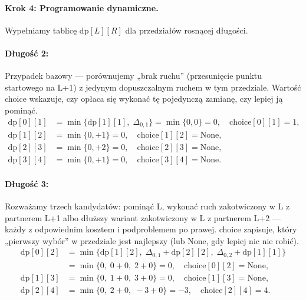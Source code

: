 \paragraph{Krok 4: Programowanie dynamiczne.}

Wypełniamy tablicę $\mathrm{dp}[L][R]$ dla przedziałów rosnącej długości.

\paragraph{Długość 2:} Przypadek bazowy — porównujemy „brak ruchu” (przesunięcie punktu startowego na L+1) z jedynym dopuszczalnym ruchem w tym przedziale. Wartość choice wskazuje, czy opłaca się wykonać tę pojedynczą zamianę, czy lepiej ją pominąć.
\begin{equation}\label{dp_len_2}
\begin{aligned}
\mathrm{dp}[0][1] &= \min\{\mathrm{dp}[1][1], \; \Delta_{0,1}\} = \min\{0, 0\} = 0, \quad \mathrm{choice}[0][1] = 1, \\
\mathrm{dp}[1][2] &= \min\{0, +1\} = 0, \quad \mathrm{choice}[1][2] = \text{None}, \\
\mathrm{dp}[2][3] &= \min\{0, +2\} = 0, \quad \mathrm{choice}[2][3] = \text{None}, \\
\mathrm{dp}[3][4] &= \min\{0, +1\} = 0, \quad \mathrm{choice}[3][4] = \text{None}.
\end{aligned}
\end{equation}

\paragraph{Długość 3:} Rozważamy trzech kandydatów: pominąć L, wykonać ruch zakotwiczony w L z partnerem L+1 albo dłuższy wariant zakotwiczony w L z partnerem L+2 — każdy z odpowiednim kosztem i podproblemem po prawej. choice zapisuje, który „pierwszy wybór” w przedziale jest najlepszy (lub None, gdy lepiej nic nie robić).
\begin{equation}\label{dp_len_3}
\begin{aligned}
\mathrm{dp}[0][2] &= \min\{\mathrm{dp}[1][2], \; \Delta_{0,1} + \mathrm{dp}[2][2], \; \Delta_{0,2} + \mathrm{dp}[1][1]\} \\
&= \min\{0, \; 0 + 0, \; 2 + 0\} = 0, \quad \mathrm{choice}[0][2] = \text{None}, \\
\mathrm{dp}[1][3] &= \min\{0, \; 1 + 0, \; 3 + 0\} = 0, \quad \mathrm{choice}[1][3] = \text{None}, \\
\mathrm{dp}[2][4] &= \min\{0, \; 2 + 0, \; -3 + 0\} = -3, \quad \mathrm{choice}[2][4] = 4.
\end{aligned}
\end{equation}


